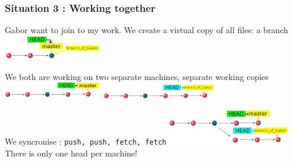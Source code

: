 \documentclass[aspectratio=169]{beamer}
\begin{document}
\begin{frame}
\frametitle<presentation>{Situation 3 : Working together}

\begin{block}{Gabor want to join to my work. We create a virtual copy of all files: a branch}
	\includegraphics[width=120pt]{pictures/git-mater-working-simultanously-1.png}
	\end{block}
	
	\begin{block}{We both are working on two separate machines, separate working copies }
	\includegraphics[width=120pt]{pictures/git-mater-working-simultanously-2.png}
	\hfill
	\includegraphics[width=140pt]{pictures/git-mater-working-simultanously-3.png}
	\end{block}
	
	\begin{block}{We syncronise : \texttt{push, push, fetch, fetch}}
	\includegraphics[width=150pt]{pictures/git-mater-working-simultanously-4.png}
	There is only one head per machine!
	\end{block}
	
	 
	
\end{frame}
\end{document}
